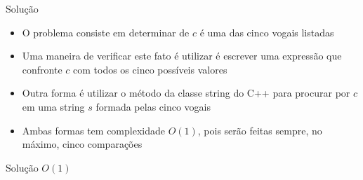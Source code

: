 \begin{frame}[fragile]{Solução}

    \begin{itemize}
        \item O problema consiste em determinar de $c$ é uma das cinco vogais listadas

        \item Uma maneira de verificar este fato é utilizar é escrever uma expressão que
            confronte $c$ com todos os cinco possíveis valores

        \item Outra forma é utilizar o método  da classe string do C++ para
            procurar por $c$ em uma string $s$ formada pelas cinco vogais

        \item Ambas formas tem complexidade $O(1)$, pois serão feitas sempre, no máximo,
            cinco comparações

    \end{itemize}

\end{frame}

\begin{frame}[fragile]{Solução $O(1)$}
\end{frame}
